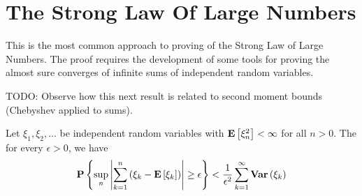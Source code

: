 \section{The Strong Law Of Large Numbers}

This is the most common approach to proving of the Strong Law of Large
Numbers.  The proof requires the development of some tools for proving
the almost sure converges of infinite sums of independent random
variables.

TODO: Observe how this next result is related to second moment bounds (Chebyshev
applied to sums).

\begin{lem}\label{KolmogorovMaximalInequality}Let
  $\xi_1, \xi_2, \dots$ be independent random variables with
  $\textbf{E}\left[\xi_n^2\right] < \infty$ for all $n>0$.  The for every
  $\epsilon > 0$, we have
\begin{align*}
\textbf{P}\left \{\sup_n \left \vert \sum_{k=1}^n \left ( \xi_k - \textbf{E}\left[\xi_k\right] \right ) \right \vert
  \geq \epsilon \right \} < \frac{1}{\epsilon^2} \sum_{k=1}^\infty \textbf{Var} \left (\xi_k \right )
\end{align*}
\end{lem}
